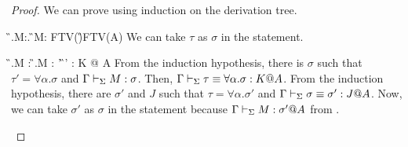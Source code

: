 \begin{proof}
    We can prove using induction on the derivation tree.
    \begin{rneqncase}{\TGen{}}{
            \G\V\Lambda\alpha.M:\forall\alpha.\tau@A
            \G\V M:\tau@A {} \alpha\notin\rm{FTV}(\G)\cup\rm{FTV}(A)}
        We can take \( \tau \) as \( \sigma \) in the statement.
    \end{rneqncase}
    \begin{rneqncase}{\TConv{}}{
            \G \V \Lambda\alpha.M : \tau
            \G \V \Lambda\alpha.M : \tau'  \G \V \tau \E \tau' : K @ A}
        From the induction hypothesis, there is \( \sigma \) such that \( \tau'
        = \forall\alpha.\sigma \) and \( \Gamma \vdash_\Sigma M : \sigma \). Then, \( \Gamma \vdash_\Sigma
        \tau \equiv \forall\alpha.\sigma : K @ A \). From the induction hypothesis,
        there are \( \sigma' \) and \( J \) such that \( \tau =
        \forall\alpha.\sigma' \) and \( \Gamma \vdash_\Sigma \sigma \equiv \sigma' : J @ A \).
        Now, we can take \( \sigma' \) as \( \sigma \) in the statement because
        \( \Gamma \vdash_\Sigma M : \sigma' @ A \) from \TConv.
    \end{rneqncase}
    \end{proof}

%


